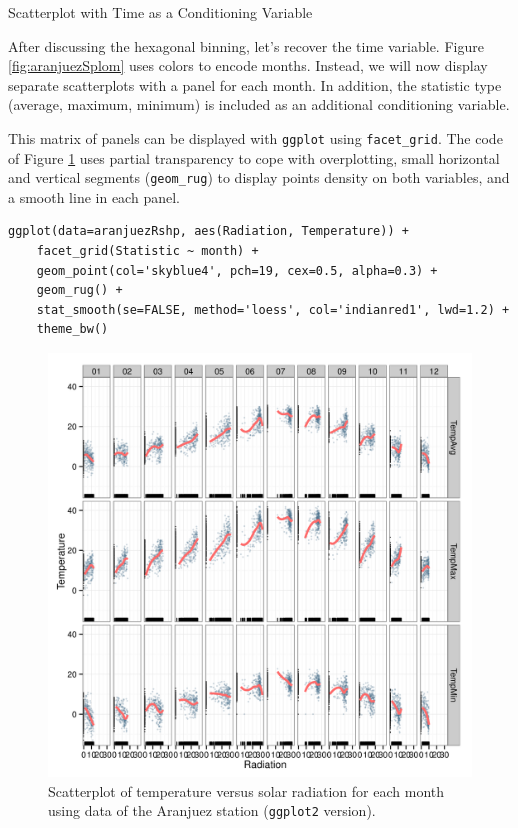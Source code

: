 \documentclass[presentation]{beamer}
\begin{document}
\begin{frame}[fragile,label=sec-2]{Scatterplot with Time as a Conditioning Variable}
 \hypertarget{SEC:conditionVariable}{}

After discussing the hexagonal binning, let's recover the time
variable. Figure \ref{fig:aranjuezSplom} uses colors to encode
months. Instead, we will now display separate scatterplots with a
panel for each month. In addition, the statistic type (average,
maximum, minimum) is included as an additional conditioning variable.

This matrix of panels can be displayed with \texttt{ggplot} using
\texttt{facet\_grid}. The code of Figure \ref{fig:aranjuezFacetGrid} uses partial
transparency to cope with overplotting, small horizontal and vertical
segments (\texttt{geom\_rug}) to display points density on both variables, and
a smooth line in each panel.
\lstset{language=R,numbers=none}
\begin{lstlisting}
ggplot(data=aranjuezRshp, aes(Radiation, Temperature)) +
    facet_grid(Statistic ~ month) +
    geom_point(col='skyblue4', pch=19, cex=0.5, alpha=0.3) +
    geom_rug() +
    stat_smooth(se=FALSE, method='loess', col='indianred1', lwd=1.2) +
    theme_bw()
\end{lstlisting}

\begin{figure}[htb]
\centering
\includegraphics[width=.9\linewidth]{figs/aranjuezFacetGrid.png}
\caption{\label{fig:aranjuezFacetGrid}Scatterplot of temperature versus solar radiation for each month using data of the Aranjuez station (\texttt{ggplot2} version).}
\end{figure}


\end{frame}
\end{document}
